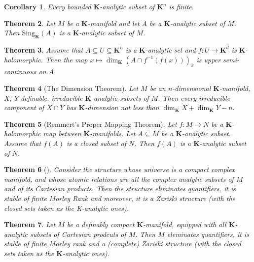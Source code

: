 \documentclass{amsart}
\newtheorem{theorem}{Theorem}[subsection]
\newtheorem{corollary}[theorem]{Corollary}
\theoremstyle{definition}
\numberwithin{equation}{section}
\begin{document}
\begin{corollary}
  Every bounded $\mathbf{K}$-analytic subset of $\mathbf{K}^n$ is finite.
\end{corollary}

\begin{theorem}
  Let $M$ be a $\mathbf{K}$-manifold and let $A$ be a $\mathbf{K}$-analytic subset of $M$.
  Then $\mathrm{Sing}_{\mathbf{K}}(A)$ is a $\mathbf{K}$-analytic subset of $M$.
\end{theorem}

\begin{theorem}
  Assume that $A \subseteq U \subseteq \mathbf{K}^n$ is a $\mathbf{K}$-analytic set and $f: U \to \mathbf{K}^d$ is $\mathbf{K}$-holomorphic.
  Then the map $x\mapsto \dim_{\mathbf{K}}(A\cap f^{-1}(f(x)))_x$ is upper semi-continuous on $A$.
\end{theorem}

\begin{theorem}[The Dimension Theorem]
  Let $M$ be an $n$-dimensional \hspace{0em}
  $\mathbf{K}$-manifold,
  $X$, $Y$ definable, irreducible $\mathbf{K}$-analytic subsets of $M$.
  Then every irreducible component of $X \cap Y$ has $\mathbf{K}$-dimension not less than $\dim_{\mathbf{K}}X + \dim_{\mathbf{K}}Y - n$.
\end{theorem}

\begin{theorem}[Remmert's Proper Mapping Theorem]
  Let $f: M \to N$ be a $\mathbf{K}$-holomorphic map between $\mathbf{K}$-manifolds.
  Let $A \subseteq M$ be a $\mathbf{K}$-analytic subset.
  Assume that $f(A)$ is a closed subset of $N$.
  Then $f(A)$ is a $\mathbf{K}$-analytic subset of $N$.
\end{theorem}

\begin{theorem}[{\cite{zbMATH00554994}}]
  Consider the structure whose universe is a compact complex manifold,
  and whose atomic relations are all the complex analytic subsets of $M$ and of its Cartesian products.
  Then the structure eliminates quantifiers,
  it is stable of finite Morley Rank and moreover,
  it is a Zariski structure
  (with the closed sets taken as the K-analytic ones).
\end{theorem}

\begin{theorem}
  Let $M$ be a definably compact $\mathbf{K}$-manifold,
  equipped with all $\mathbf{K}$-analytic subsets of Cartesian prodcuts of $M$.
  Then $M$ eleminates quantifiers,
  it is stable of finite Morley rank and a (complete) Zariski structure
  (with the closed sets taken as the $\mathbf{K}$-analytic ones).
\end{theorem}
\end{document}
